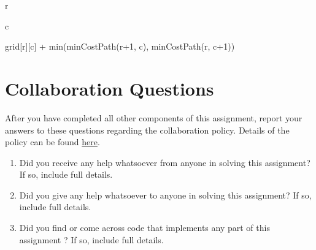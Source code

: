 \documentclass[11pt,addpoints,answers]{exam}
\begin{document}
\begin{questions}
\begin{parts}
\begin{subparts}
    \begin{your_code_solution_outer}[height=1.75cm, width=\textwidth/2, title=Your Python code for missing field \textbf{(4)}]
    \begin{your_code_solution}
    r
    \end{your_code_solution}
    \end{your_code_solution_outer}
   \begin{your_code_solution_outer}[height=1.75cm, width=\textwidth/2, title=Your Python code for missing field \textbf{(5)}]
    \begin{your_code_solution}
    c
    \end{your_code_solution}
    \end{your_code_solution_outer}

    \begin{your_code_solution_outer}[height=1.75cm, width=\textwidth, title=Your Python code for missing field \textbf{(6)}]
    \begin{your_code_solution}
    grid[r][c] + min(minCostPath(r+1, c), minCostPath(r, c+1))
    \end{your_code_solution}
    \end{your_code_solution_outer}
    

    
\end{subparts}

\end{parts}
\end{questions}
\newpage
\section{Collaboration Questions}
After you have completed all other components of this assignment, report your answers to these questions regarding the collaboration policy. Details of the policy can be found \href{http://www.cs.cmu.edu/~mgormley/courses/10601/syllabus.html}{here}.
\begin{enumerate}
    \item Did you receive any help whatsoever from anyone in solving this assignment? If so, include full details.
    \item Did you give any help whatsoever to anyone in solving this assignment? If so, include full details.
    \item Did you find or come across code that implements any part of this assignment ? If so, include full details.
\end{enumerate}
\end{document}
